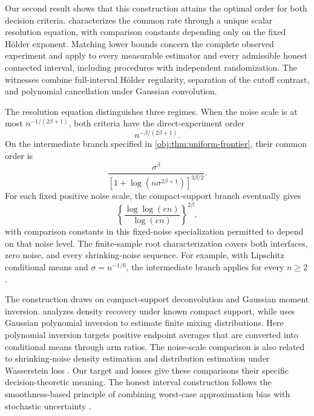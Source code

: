 Our second result shows that this construction attains the optimal order for both decision criteria.  characterizes the common rate through a unique scalar resolution equation, with comparison constants depending only on the fixed Hölder exponent. Matching lower bounds concern the complete observed experiment and apply to every measurable estimator and every admissible honest connected interval, including procedures with independent randomization. The witnesses combine full-interval Hölder regularity, separation of the cutoff contrast, and polynomial cancellation under Gaussian convolution.

The resolution equation distinguishes three regimes. When the noise scale is at most \(n^{-1/(2\beta+1)}\), both criteria have the direct-experiment order
\[
n^{-\beta/(2\beta+1)}.
\]
On the intermediate branch specified in \cref{obj:thm:uniform-frontier}, their common order is
\[
\frac{\sigma^\beta}
{[1+\log(n\sigma^{2\beta+1})]^{3\beta/2}}.
\]
For each fixed positive noise scale, the compact-support branch eventually gives
\[
\left\{\frac{\log\log(en)}{\log(en)}\right\}^{2\beta},
\]
with comparison constants in this fixed-noise specialization permitted to depend on that noise level. The finite-sample root characterization covers both interfaces, zero noise, and every shrinking-noise sequence. For example, with Lipschitz conditional means and \(\sigma=n^{-1/6}\), the intermediate branch applies for every \(n\ge2\).

The construction draws on compact-support deconvolution and Gaussian moment inversion. \citet[Theorem~1(a), fixed-support case]{Meister2007CompactSupport} analyzes density recovery under known compact support, while \citet[Theorem~1; Section~4.1]{WuYang2020DenoisedMoments} uses Gaussian polynomial inversion to estimate finite mixing distributions. Here polynomial inversion targets positive endpoint averages that are converted into conditional means through arm ratios. The noise-scale comparison is also related to shrinking-noise density estimation \citep[Theorems~2.1 and 2.2]{Delaigle2008ShrinkingNoise} and distribution estimation under Wasserstein loss \citep[Section~2, Theorems~2.4--2.6]{DurotMukherjee2026VanishingNoise}. Our target and losses give these comparisons their specific decision-theoretic meaning. The honest interval construction follows the smoothness-based principle of combining worst-case approximation bias with stochastic uncertainty \citep{ArmstrongKolesar2018OptimalInference,ArmstrongKolesar2020SimpleHonest}.

